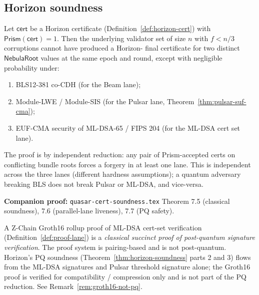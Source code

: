 
\subsection*{Horizon soundness}

\begin{theorem}
\label{thm:horizon-soundness}
Let $\mathsf{cert}$ be a Horizon certificate
(Definition~\ref{def:horizon-cert}) with
$\mathsf{Prism}(\mathsf{cert}) = 1$. Then the underlying validator set
of size $n$ with $f < n/3$ corruptions cannot have produced a Horizon-
final certificate for two distinct $\mathsf{NebulaRoot}$ values at the
same epoch and round, except with negligible probability under:
\begin{enumerate}[nosep]
  \item BLS12-381 co-CDH (for the Beam lane);
  \item Module-LWE / Module-SIS (for the Pulsar lane,
        Theorem~\ref{thm:pulsar-suf-cma});
  \item EUF-CMA security of ML-DSA-65 / FIPS 204 (for the ML-DSA cert
        set lane).
\end{enumerate}
The proof is by independent reduction: any pair of Prism-accepted certs
on conflicting bundle roots forces a forgery in at least one lane.
This is independent across the three lanes (different hardness
assumptions); a quantum adversary breaking BLS does not break Pulsar
or ML-DSA, and vice-versa.

\textbf{Companion proof:} \texttt{quasar-cert-soundness.tex} Theorem
7.5 (classical soundness), 7.6 (parallel-lane liveness), 7.7 (PQ
safety).
\end{theorem}

\begin{remark}
\label{rem:groth16-wrapper}
A Z-Chain Groth16 rollup proof of ML-DSA cert-set verification
(Definition~\ref{def:proof-lane}) is a \emph{classical succinct proof of
post-quantum signature verification}. The proof system is
pairing-based and is not post-quantum. Horizon's PQ soundness
(Theorem~\ref{thm:horizon-soundness} parts 2 and 3) flows from the
ML-DSA signatures and Pulsar threshold signature alone; the Groth16
proof is verified for compatibility / compression only and is not part
of the PQ reduction. See Remark~\ref{rem:groth16-not-pq}.
\end{remark}
